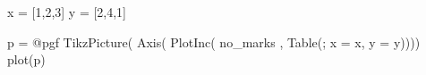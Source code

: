 \documentclass{article}
\begin{document}
\begin{jlblock}
	x = [1,2,3]
	y = [2,4,1]

	p = @pgf TikzPicture(
            Axis(
                PlotInc({ no_marks },
                    Table(; x = x, y = y))))
	plot(p)
\end{jlblock}

\end{document}
